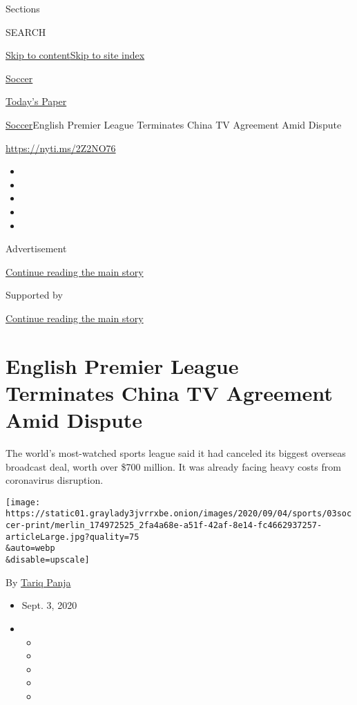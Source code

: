 Sections

SEARCH

\protect\hyperlink{site-content}{Skip to
content}\protect\hyperlink{site-index}{Skip to site index}

\href{https://www.nytimes3xbfgragh.onion/section/sports/soccer}{Soccer}

\href{https://myaccount.nytimes3xbfgragh.onion/auth/login?response_type=cookie\&client_id=vi}{}

\href{https://www.nytimes3xbfgragh.onion/section/todayspaper}{Today's
Paper}

\href{/section/sports/soccer}{Soccer}\textbar{}English Premier League
Terminates China TV Agreement Amid Dispute

\url{https://nyti.ms/2Z2NO76}

\begin{itemize}
\item
\item
\item
\item
\item
\end{itemize}

Advertisement

\protect\hyperlink{after-top}{Continue reading the main story}

Supported by

\protect\hyperlink{after-sponsor}{Continue reading the main story}

\hypertarget{english-premier-league-terminates-china-tv-agreement-amid-dispute}{%
\section{English Premier League Terminates China TV Agreement Amid
Dispute}\label{english-premier-league-terminates-china-tv-agreement-amid-dispute}}

The world's most-watched sports league said it had canceled its biggest
overseas broadcast deal, worth over \$700 million. It was already facing
heavy costs from coronavirus disruption.

\texttt{[image: https://static01.graylady3jvrrxbe.onion/images/2020/09/04/sports/03soccer-print/merlin\_174972525\_2fa4a68e-a51f-42af-8e14-fc4662937257-articleLarge.jpg?quality=75\\\&auto=webp\\\&disable=upscale]}

By \href{https://www.nytimes3xbfgragh.onion/by/tariq-panja}{Tariq Panja}

\begin{itemize}
\item
  Sept. 3, 2020
\item
  \begin{itemize}
  \item
  \item
  \item
  \item
  \item
  \end{itemize}
\end{itemize}

